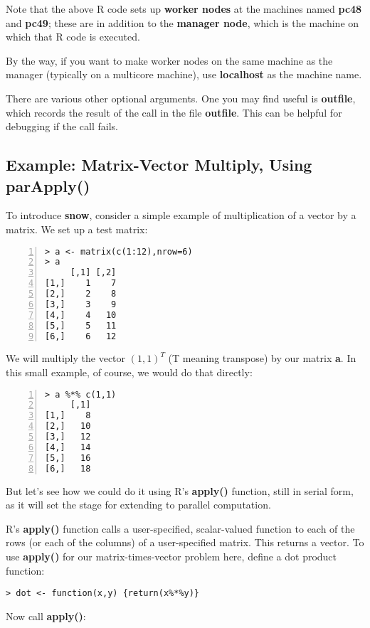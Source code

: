 Note that the above R code sets up {\bf worker nodes} at the machines
named {\bf pc48} and {\bf pc49}; these are in addition to the {\bf
manager node}, which is the machine on which that R code is
executed.

By the way, if you want to make worker nodes on the same machine as the
manager (typically on a multicore machine), use {\bf localhost} as the
machine name.

There are various other optional arguments.  One you may find useful is
{\bf outfile}, which records the result of the call in the file {\bf
outfile}.  This can be helpful for debugging if the call fails.

\subsection{Example:  Matrix-Vector Multiply, Using parApply()}

To introduce {\bf snow}, consider a simple example of multiplication of
a vector by a matrix.  We set up a test matrix:

\begin{lstlisting}[numbers=left]
> a <- matrix(c(1:12),nrow=6)
> a
     [,1] [,2]
[1,]    1    7
[2,]    2    8
[3,]    3    9
[4,]    4   10
[5,]    5   11
[6,]    6   12
\end{lstlisting}

We will multiply the vector $(1,1)^{T}$ (T meaning transpose) by our
matrix {\bf a}.  In this small example, of course, we would do that
directly:

\begin{lstlisting}[numbers=left]
> a %*% c(1,1)
     [,1]
[1,]    8
[2,]   10
[3,]   12
[4,]   14
[5,]   16
[6,]   18
\end{lstlisting}


But let's see how we could do it using R's {\bf apply()} function, still
in serial form, as it will set the stage for extending to parallel
computation.

R's {\bf apply()} function calls a user-specified, scalar-valued
function to each of the rows (or each of the columns) of a
user-specified matrix.  This returns a vector.  To use {\bf apply()} for
our matrix-times-vector problem here, define a dot product function:

\begin{lstlisting}
> dot <- function(x,y) {return(x%*%y)}
\end{lstlisting}

Now call {\bf apply()}:

